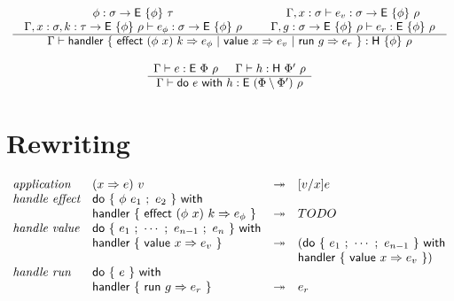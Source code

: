 \documentclass{article}
\begin{document}
\[ \begin{array}{cc}

  \begin{array}{c} 
   \begin{array}{c}
    \phi : \sigma \rightarrow \textsf{E} ~ \{ \phi \} ~ \tau
    \\
    \Gamma, x:\sigma, k:\tau \rightarrow \textsf{E} ~ \{ \phi \} ~ \rho
    \vdash e_\phi:\sigma \rightarrow \textsf{E} ~ \{ \phi \} ~ \rho
   \end{array}
   \hspace{1.5em}
   \begin{array}{c}
    \Gamma, x:\sigma \vdash e_v:\sigma \rightarrow \textsf{E} ~ \{ \phi \} ~ \rho
    \\
    \Gamma, g:\sigma \rightarrow \textsf{E} ~ \{ \phi \} ~ \rho \vdash e_r:\textsf{E} ~ \{ \phi \} ~ \rho
   \end{array}
   \\ \hline 
   \Gamma \vdash
   \textsf{handler} ~ \{ ~
   \textsf{effect} ~ (\phi ~ x) ~ k \Rightarrow e_\phi ~ | ~
   \textsf{value} ~ x \Rightarrow e_v ~ | ~
   \textsf{run} ~ g \Rightarrow e_r
   ~ \} :
   \textsf{H} ~ \{ \phi \} ~ \rho
   \end{array}

  \\\\

  \begin{array}{c} 
   \Gamma \vdash e:\textsf{E} ~ \Phi ~ \rho
   \hspace{1.5em}
   \Gamma \vdash h:\textsf{H} ~ \Phi' ~ \rho
   \\ \hline 
   \Gamma \vdash
   \textsf{do} ~ e ~ \textsf{with} ~ h : \textsf{E} ~ (\Phi \setminus \Phi') ~ \rho
   \end{array}
 \end{array} \]

\newpage
\section{Rewriting}

\[ \begin{array}{llcl}
    \textit{application} &
    (x \Rightarrow e) ~ v
    &\twoheadrightarrow&
    [v/x] e
    \\

    \textit{handle effect} &
    \textsf{do}~\{~\phi~e_1~;~e_2~\}~\textsf{with} && \\ &
    \textsf{handler}~\{~\textsf{effect}~(\phi~x)~k \Rightarrow e_\phi~\}
    &\twoheadrightarrow&
    TODO
    \\

    \textit{handle value} &
    \textsf{do}~\{~e_1~;~\cdots~;~e_{n-1}~;~e_n~\}~\textsf{with} && \\ &
    \textsf{handler} ~ \{~\textsf{value}~x \Rightarrow e_v~\}
    &\twoheadrightarrow&
    (\textsf{do}~\{~e_1~;~\cdots~;~e_{n-1}~\}~\textsf{with} \\ &&&
    \textsf{handler} ~ \{~\textsf{value}~x \Rightarrow e_v~\})
    \\

    \textit{handle run} &
    \textsf{do}~\{~e~\}~\textsf{with} && \\ &
    \textsf{handler} ~ \{~\textsf{run}~g \Rightarrow e_r~\}
    &\twoheadrightarrow&
    e_r
    \\

\end{array} \]
\end{document}
